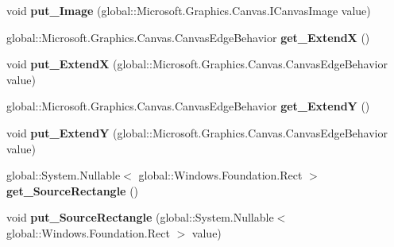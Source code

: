 \begin{DoxyCompactItemize}
void {\bfseries put\+\_\+\+Image} (global\+::\+Microsoft.\+Graphics.\+Canvas.\+I\+Canvas\+Image value)
\item 
\mbox{\label{interface_microsoft_1_1_graphics_1_1_canvas_1_1_brushes_1_1_i_canvas_image_brush_aa972b7d23b8fc1eb398d518a07940b35}} 
global\+::\+Microsoft.\+Graphics.\+Canvas.\+Canvas\+Edge\+Behavior {\bfseries get\+\_\+\+ExtendX} ()
\item 
\mbox{\label{interface_microsoft_1_1_graphics_1_1_canvas_1_1_brushes_1_1_i_canvas_image_brush_a5355b52f83105ebc903d8a09622319eb}} 
void {\bfseries put\+\_\+\+ExtendX} (global\+::\+Microsoft.\+Graphics.\+Canvas.\+Canvas\+Edge\+Behavior value)
\item 
\mbox{\label{interface_microsoft_1_1_graphics_1_1_canvas_1_1_brushes_1_1_i_canvas_image_brush_aa40db9376b341ac0233a6f2984cff951}} 
global\+::\+Microsoft.\+Graphics.\+Canvas.\+Canvas\+Edge\+Behavior {\bfseries get\+\_\+\+ExtendY} ()
\item 
\mbox{\label{interface_microsoft_1_1_graphics_1_1_canvas_1_1_brushes_1_1_i_canvas_image_brush_a02ac0206445780a5997e968f76eeb0f0}} 
void {\bfseries put\+\_\+\+ExtendY} (global\+::\+Microsoft.\+Graphics.\+Canvas.\+Canvas\+Edge\+Behavior value)
\item 
\mbox{\label{interface_microsoft_1_1_graphics_1_1_canvas_1_1_brushes_1_1_i_canvas_image_brush_abd99fb761de06f6a5a4446147e3b0dee}} 
global\+::\+System.\+Nullable$<$ global\+::\+Windows.\+Foundation.\+Rect $>$ {\bfseries get\+\_\+\+Source\+Rectangle} ()
\item 
\mbox{\label{interface_microsoft_1_1_graphics_1_1_canvas_1_1_brushes_1_1_i_canvas_image_brush_a18db26edd67cb06b7b78f0e7709c8806}} 
void {\bfseries put\+\_\+\+Source\+Rectangle} (global\+::\+System.\+Nullable$<$ global\+::\+Windows.\+Foundation.\+Rect $>$ value)

\end{DoxyCompactItemize}
